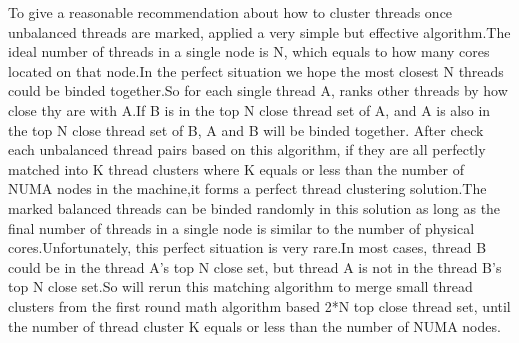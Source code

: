 To give a reasonable recommendation about how to cluster threads once unbalanced threads are marked, \NP{} applied a very simple but effective algorithm.The ideal number of threads in a single node is N, which equals to how many cores located on that node.In the perfect situation we hope the most closest N threads could be binded together.So for each single thread A, \NP{} ranks other threads by how close thy are with A.If B is in the top N close thread set of A, and A is also in the top N close thread set of B, A and B will be binded together. After check each unbalanced thread pairs based on this algorithm, if they are all perfectly matched into K thread clusters where K equals or less than the number of NUMA nodes in the machine,it forms a perfect thread clustering solution.The marked balanced threads can be binded randomly in this solution as long as the final number of threads in a single node is similar to the number of physical cores.Unfortunately, this perfect situation is very rare.In most cases, thread B could be in the thread A's top N close set, but thread A is not in the thread B's top N close set.So \NP{} will rerun this matching algorithm to merge small thread clusters from the first round math algorithm based 2*N top close thread set, until the number of thread cluster K equals or less than the number of NUMA nodes.